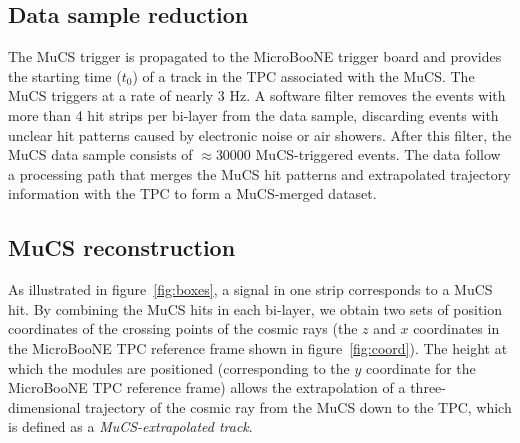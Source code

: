 \documentclass[a4paper,11pt]{article}
\begin{document}
\subsection{Data sample reduction}\label{sec:data_proc}
The MuCS trigger is propagated to the MicroBooNE trigger board and provides the starting time ($t_0$) of a track in the TPC associated with the MuCS.
The MuCS triggers at a rate of nearly 3 Hz.
A software filter removes the events with more than 4 hit strips per bi-layer from the data sample, discarding events with unclear hit patterns caused by electronic noise or air showers. After this filter, the MuCS data sample consists of $\approx$30000 MuCS-triggered events.
The data follow a processing path that merges the MuCS hit patterns and extrapolated trajectory information with the TPC to form a MuCS-merged dataset. %


\subsection{MuCS reconstruction}\label{sec:mucsreco}
As illustrated in figure~\ref{fig:boxes}, a signal in one strip corresponds to a MuCS hit. By combining the MuCS hits in each bi-layer, we obtain two sets of position coordinates of the crossing points of the cosmic rays (the $z$ and $x$ coordinates in the MicroBooNE TPC reference frame shown in figure~\ref{fig:coord}). The height at which the modules are positioned (corresponding to the $y$ coordinate for the MicroBooNE TPC reference frame) allows the extrapolation of a three-dimensional trajectory of the cosmic ray from the MuCS down to the TPC, which is defined as a \emph{MuCS-extrapolated track}.
\end{document}

